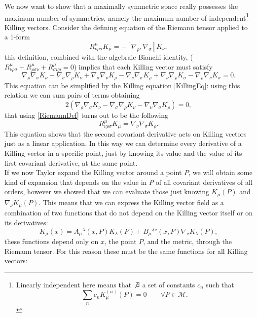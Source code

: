 We now want to show that a maximally symmetric space really possesses the maximum number of symmetries, namely the maximum number of independent\footnote{Linearly independent here means that $\not\exists$ a set of constants $c_n$ such that $$\sum_n c_n K_\mu^{(n)}(P)=0 \qquad \forall P\in\mathcal{M}.$$} Killing vectors.
Consider the defining equation of the Riemann tensor applied to a 1-form
\begin{equation}
    R^{\mu}_{\nu\rho\sigma}K_\mu=-[\nabla_\rho,\nabla_\sigma]K_\nu,\label{RiemannDef}
\end{equation}
this definition, combined with the algebraic Bianchi identity, ($R^\mu_{\nu\rho\sigma}+R^\mu_{\rho\sigma\nu}+R^\mu_{\sigma\nu\rho}=0 $) implies that each Killing vector must satisfy
$$\nabla_\rho\nabla_\sigma K_\nu-\nabla_\sigma\nabla_\rho K_\nu +\nabla_\sigma\nabla_\nu K_\rho-\nabla_\nu\nabla_\sigma K_\rho+\nabla_\nu\nabla_\rho K_\sigma-\nabla_\rho\nabla_\nu K_\sigma=0.$$
This equation can be simplified by the Killing equation \eqref{KillingEq}: using this relation we can sum pairs of terms obtaining $$ 2(\nabla_\rho\nabla_\sigma K_\nu-\nabla_\sigma\nabla_\rho K_\nu -\nabla_\nu\nabla_\sigma K_\rho)=0,$$ that using \eqref{RiemannDef} turns out to be the following
\begin{equation}
    R^\mu_{\nu\rho\sigma}K_\mu=\nabla_\nu\nabla_\sigma K_\rho. \label{RNabla}
\end{equation}
This equation shows that the second covariant derivative acts on Killing vectors just as a linear application. In this way we can determine every derivative of a Killing vector in a specific point, just by knowing its value and the value of its first covariant derivative, at the same point.\\
If we now Taylor expand the Killing vector around a point $P$, we will obtain some kind of expansion that depends on the value in $P$ of all covariant derivatives of all orders, however we showed that we can evaluate those just knowing $K_\mu(P)$ and $\nabla_\nu K_\mu(P)$. This means that we can express the Killing vector field as a combination of two functions that do not depend on the Killing vector itself or on its derivatives:
\begin{equation*}
    K_\mu(x)=A_\mu\phantom{}^\lambda(x,P)K_\lambda(P)+B_\mu\phantom{}^{\lambda\nu}(x,P)\nabla_\nu K_\lambda(P),
\end{equation*}
these functions depend only on $x$, the point $P$, and the metric, through the Riemann tensor. For this reason these must be the same functions for all Killing vectors:
